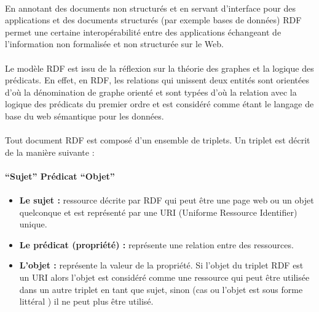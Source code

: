 \documentclass[12pt, a4paper, oneside]{book}
\begin{document}
\paragraph{}
En annotant des documents non structurés et en servant d'interface pour des applications et des documents structurés (par exemple bases de données) RDF permet une certaine interopérabilité entre des applications échangeant de l'information non formalisée et non structurée sur le Web.
\paragraph{}
Le modèle RDF est issu de la réflexion sur la théorie des graphes et la logique des prédicats. 
En effet, en RDF, les relations qui unissent deux entités sont orientées d'où la dénomination de graphe orienté et sont typées d'où la relation avec la logique des prédicats du premier ordre et est considéré comme étant le langage de base du web sémantique pour les données. 
\paragraph{}
Tout document RDF est composé d'un ensemble de triplets. Un triplet est décrit de la manière suivante :
\paragraph{}
\textbf{“Sujet” Prédicat “Objet”}
\paragraph{}

\begin{itemize}

\item \textbf{Le sujet : }ressource décrite par RDF qui peut être une page web ou un objet quelconque et est représenté par une URI (Uniforme Ressource Identifier) unique.
\item \textbf{Le prédicat (propriété) : }représente une relation entre des ressources.
\item \textbf{L'objet : }représente la valeur de la propriété. Si l'objet du triplet RDF est un URI alors
l'objet est considéré comme une ressource qui peut être utilisée dans un autre triplet en tant
que sujet, sinon (cas ou l'objet est sous forme littéral ) il ne peut plus être utilisé.

\end{itemize}
\end{document}
